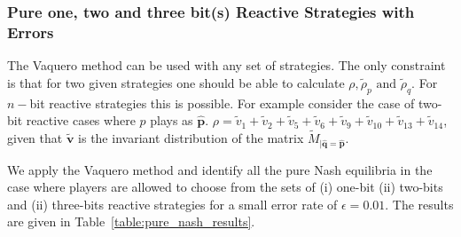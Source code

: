 \documentclass{article}
\theoremstyle{definition}
\begin{document}
\subsubsection{Pure one, two and three bit(s) Reactive Strategies with Errors}

The Vaquero method can be used with any set of strategies. The only
constraint is that for two given strategies one should be able to calculate
\(\rho, \tilde{\rho}_p \text{ and } \tilde{\rho}_q\).
For \(n-\)bit reactive strategies this is possible. For example consider the
case of two-bit reactive cases where \(p\) plays as \(\mathbf{\hat{p}}\). \(\rho
= \tilde{v}_{1} + \tilde{v}_{2} + \tilde{v}_{5} + \tilde{v}_{6} + \tilde{v}_{9}
+  \tilde{v}_{10} + \tilde{v}_{13} + \tilde{v}_{14}\), given that
\(\mathbf{\tilde{v}}\) is the invariant distribution of the matrix
\(\tilde{M}_{|\mathbf{\hat{q}}=\mathbf{\hat{p}}}\).

We apply the Vaquero method and identify all the pure Nash equilibria in the case where
players are allowed to choose from the sets of (i) one-bit (ii) two-bits and
(ii) three-bits reactive strategies for a small error rate of \(\epsilon=0.01\).
The results are given in Table~\ref{table:pure_nash_results}.
\end{document}
